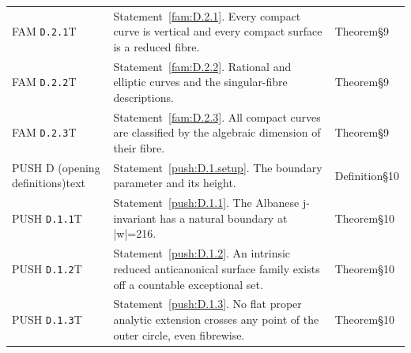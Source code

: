\documentclass[11pt,a4paper]{article}
\theoremstyle{plain}
\theoremstyle{definition}
\begin{document}
\begin{longtable}{@{}L{.18\linewidth}L{.48\linewidth}L{.29\linewidth}@{}}
FAM \nolinkurl{D.2.1}\newline T & Statement~\ref{fam:D.2.1}. Every compact curve is vertical and every compact surface is a reduced fibre.\newline {} & Theorem\newline §9\\
FAM \nolinkurl{D.2.2}\newline T & Statement~\ref{fam:D.2.2}. Rational and elliptic curves and the singular-fibre descriptions.\newline {} & Theorem\newline §9\\
FAM \nolinkurl{D.2.3}\newline T & Statement~\ref{fam:D.2.3}. All compact curves are classified by the algebraic dimension of their fibre.\newline {} & Theorem\newline §9\\
PUSH D (opening definitions)\newline text & Statement~\ref{push:D.1.setup}. The boundary parameter and its height.\newline {} & Definition\newline §10\\
PUSH \nolinkurl{D.1.1}\newline T & Statement~\ref{push:D.1.1}. The Albanese j-invariant has a natural boundary at |w|=216.\newline {} & Theorem\newline §10\\
PUSH \nolinkurl{D.1.2}\newline T & Statement~\ref{push:D.1.2}. An intrinsic reduced anticanonical surface family exists off a countable exceptional set.\newline {} & Theorem\newline §10\\
PUSH \nolinkurl{D.1.3}\newline T & Statement~\ref{push:D.1.3}. No flat proper analytic extension crosses any point of the outer circle, even fibrewise.\newline {} & Theorem\newline §10\\

\end{longtable}
\end{document}
